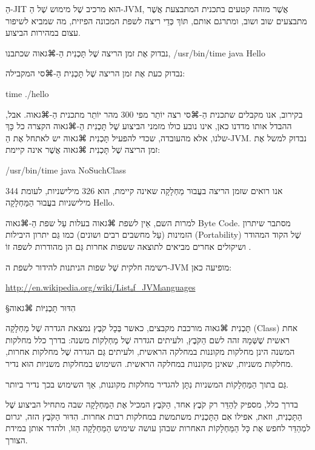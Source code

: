 הַ-JIT הוּא מרכיב שֶׁל מימוש שֶׁל הַ-JVM, אֲשֶׁר מזהה קטעים בתכנית המתבצעת
אֲשֶׁר מתבצעים שוב ושוב, ומתרגם אותם, תּוֹךְ כְּדֵי ריצה לשפת המכונה הפיזית, מה
שמביא לשיפור עצום במהירות הביצוע.

נבדוק אֶת זמן הריצה שֶׁל תָּכְנִית הַ-⌘גאוה שכתבנו,
/usr/bin/time java Hello
\END

נבדוק כעת אֶת זמן הריצה שֶׁל תָּכְנִית הַ-⌘סי המקבילה:

time ./hello
\END

בקירוב, אנו מקבלים שתכנית הַ-⌘סי רצה יוֹתֵר מפי 300 מהר יוֹתֵר מתכנית הַ-⌘גאוה.
אבל, ההבדל אותו מדדנו כאן, אינו נובע כולו מזמני הביצוע שֶׁל תָּכְנִית הַ-⌘גאוה
הקצרה כל כָּךְ שלנו, אלא מהעובדה, שכדי להפעיל תָּכְנִית ⌘גאוה יש לאתחל אֶת
הַ-JVM. נבדוק למשל אֶת זמן הריצה שֶׁל תָּכְנִית ⌘גאוה אֲשֶׁר אינה קיימת:

/usr/bin/time java NoSuchClass
\END

אנו רואים שזמן הריצה בעֲבוּר מַחְלָקָה שאינה קיימת, הוא 326 מילישניות, לעומת 344
מילישניות בעֲבוּר הַמַּחְלָקָה Hello.

למרות השם, אֵין לשפת ⌘גאוה בעלות עַל שפת הַ-⌘גאוה Byte Code. מסתבר שיתרון הזמינות
(עַל מחשבים רבים ושונים) כמו גַּם יתרון היבילות (Portability) שֶׁל הקוד המהודר
ושיקולים אחרים מביאים לתוצאה ששפות אחרות גַּם הן מהודרות לשפה זוֹ .

רשימה חלקית שֶׁל שפות הניתנות להידור לשפת ה-JVM מופיעה כאן:

\begin{english}
\url{http://en.wikipedia.org/wiki/Listₒf_JVMₗanguages}
\end{english}

§הִדּוּר תָּכְנִיּוֹת ⌘גאוה

תָּכְנִית ⌘גאוה מורכבת מקבצים, כאשר בְּכָל קֹבֶץ נמצאת הגדרה שֶׁל מַחְלָקָה
(Class)
 אחת ראשית שֶׁשְּׁמָהּ זהה לשם הַקֹּבֶץ,
ולעיתים הגדרה שֶׁל מַחְלְקוֹת
משנה: בדרך כלל מחלקות המשנה הינן מחלקות מקוננות במחלקה הראשית, ולעיתים גַּם
הגדרה שֶׁל מחלקות אחרות, מחלקות משניות, שאינן מקוננות במחלקה הראשית. השימוש
במחלקות משניות הוּא נדיר.

גַּם בתוך הַמַּחְלָקוֹת המשניות נִתָּן להגדיר מחלקות מקוננות, אַךְ השימוש בכך
נדיר ביותר.

בדרך כלל, מספיק לְהַדֵּר רק קֹבֶץ אחד, הַקֹּבֶץ המכיל אֶת הַמַּחְלָקָה שבה מתחיל
הביצוע שֶׁל הַתָּכְנִית, וזאת, אפילו אִם הַתָּכְנִית משתמשת במחלקות רבות אחרות.
הִדּוּר הַקֹּבֶץ הזה, יגרום למְהַדֵּר לחפש אֶת כָּל הַמַּחְלָקוֹת האחרות שבהן
עושה שימוש הַמַּחְלָקָה הַזּוֹ, ולהדר אותן במידת הצורך.

